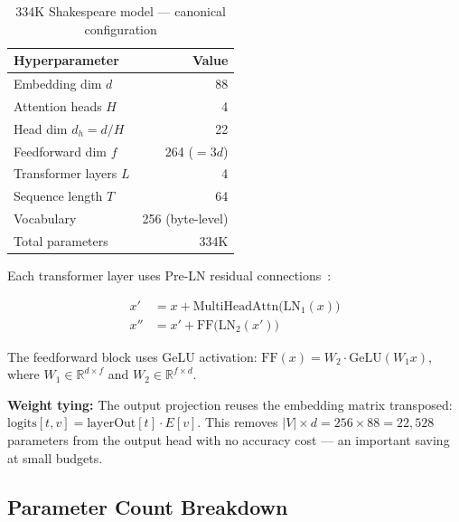 \documentclass[11pt]{article}
\begin{document}
\begin{table}[ht]
\centering
\begin{tabular}{lr}
\toprule
Hyperparameter & Value \\
\midrule
Embedding dim $d$ & 88 \\
Attention heads $H$ & 4 \\
Head dim $d_h = d/H$ & 22 \\
Feedforward dim $f$ & 264 ($= 3d$) \\
Transformer layers $L$ & 4 \\
Sequence length $T$ & 64 \\
Vocabulary & 256 (byte-level) \\
\midrule
Total parameters & 334K \\
\bottomrule
\end{tabular}
\caption{334K Shakespeare model — canonical configuration}
\label{tab:arch}
\end{table}

Each transformer layer uses Pre-LN residual connections~\cite{xiong2020layer}:

\begin{align}
x' &= x + \text{MultiHeadAttn}\bigl(\text{LN}_1(x)\bigr) \\
x'' &= x' + \text{FF}\bigl(\text{LN}_2(x')\bigr)
\end{align}

The feedforward block uses GeLU activation:
$\text{FF}(x) = W_2 \cdot \text{GeLU}(W_1 x)$, where $W_1 \in \mathbb{R}^{d \times f}$
and $W_2 \in \mathbb{R}^{f \times d}$.

\textbf{Weight tying:} The output projection reuses the embedding matrix transposed:
$\text{logits}[t, v] = \text{layerOut}[t] \cdot E[v]$.
This removes $|V| \times d = 256 \times 88 = 22{,}528$ parameters from the output head
with no accuracy cost --- an important saving at small budgets.

\subsection{Parameter Count Breakdown}
\end{document}
